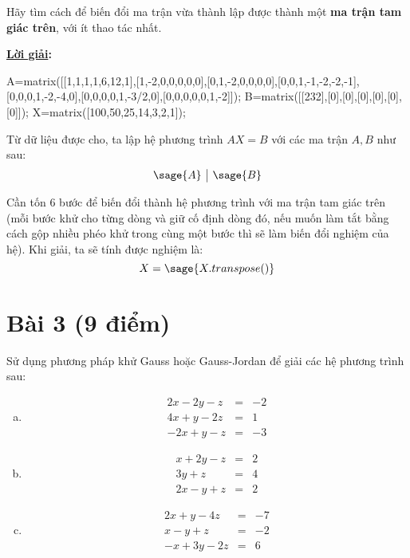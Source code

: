 \documentclass[12pt]{article}
\newcommand{\Solution}{
\medskip
{\bf \underline{Lời giải}:}
}
\begin{document}
Hãy tìm cách để biến đổi ma trận vừa thành lập được thành một \textbf{ma trận tam giác trên}, với ít thao tác nhất.

\Solution

\begin{sagesilent}
A=matrix([[1,1,1,1,6,12,1],[1,-2,0,0,0,0,0],[0,1,-2,0,0,0,0],[0,0,1,-1,-2,-2,-1],[0,0,0,1,-2,-4,0],[0,0,0,0,1,-3/2,0],[0,0,0,0,0,1,-2]]);
B=matrix([[232],[0],[0],[0],[0],[0],[0]]);
X=matrix([100,50,25,14,3,2,1]);
\end{sagesilent}

Từ dữ liệu được cho, ta lập hệ phương trình $AX=B$ với các ma trận $A, B$ như sau:
\begin{equation}
 \begin{array}{c|c}
  \sage{A} & \sage{B}
 \end{array}
\end{equation}

Cần tốn 6 bước để biến đổi thành hệ phương trình với ma trận tam giác trên (mỗi bước khử cho từng dòng và giữ cố định dòng đó, nếu muốn làm tắt bằng cách gộp nhiều phéo khử trong cùng một bước thì sẽ làm biến đổi nghiệm của hệ). Khi giải, ta sẽ tính được nghiệm là:
\begin{equation}
X=\sage{X.transpose()}
\end{equation}


\section{Bài 3 (9 điểm)}

Sử dụng phương pháp khử Gauss hoặc Gauss-Jordan để giải các hệ phương trình sau:

\begin{enumerate}[a)]
\item 
\begin{eqnarray*} %
    2x - 2y - z &=& -2\\
    4x + y - 2z &=& 1\\
    -2x + y - z &=& -3
  \end{eqnarray*}


\item 
  \begin{eqnarray*}
    x + 2y - z &=& 2\\
       3y + z &=& 4\\
    2x - y + z &=& 2
  \end{eqnarray*}


\item 
  \begin{eqnarray*}
    2x + y - 4z &=& -7\\
    x - y + z &=& -2\\
    -x + 3y - 2z &=& 6
  \end{eqnarray*}
\end{enumerate}
\end{document}
